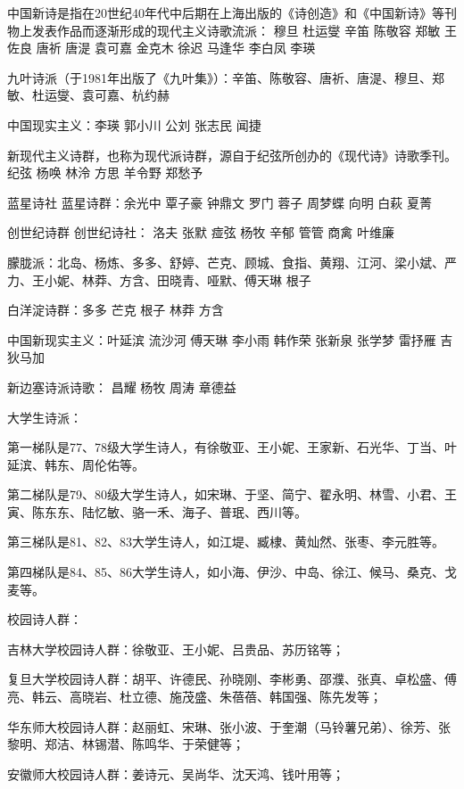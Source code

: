 \documentclass[UTF8]{../../RepresentationUniverse}
\begin{document}
中国新诗是指在20世纪40年代中后期在上海出版的《诗创造》和《中国新诗》等刊物上发表作品而逐渐形成的现代主义诗歌流派： 穆旦 杜运燮 辛笛 陈敬容 郑敏 王佐良 唐祈 唐湜 袁可嘉 金克木 徐迟 马逢华 李白凤 李瑛



九叶诗派（于1981年出版了《九叶集》）：辛笛、陈敬容、唐祈、唐湜、穆旦、郑敏、杜运燮、袁可嘉、杭约赫



中国现实主义：李瑛 郭小川 公刘 张志民 闻捷


新现代主义诗群，也称为现代派诗群，源自于纪弦所创办的《现代诗》诗歌季刊。纪弦 杨唤 林泠 方思 羊令野 郑愁予



蓝星诗社 蓝星诗群：余光中 覃子豪 钟鼎文 罗门 蓉子 周梦蝶 向明 白萩 夏菁


创世纪诗群 创世纪诗社： 洛夫 张默 痖弦 杨牧 辛郁 管管 商禽 叶维廉




朦胧派：北岛、杨炼、多多、舒婷、芒克、顾城、食指、黄翔、江河、梁小斌、严力、王小妮、林莽、方含、田晓青、哑默、傅天琳 根子 


白洋淀诗群：多多 芒克 根子 林莽 方含


中国新现实主义：叶延滨 流沙河 傅天琳 李小雨 韩作荣 张新泉 张学梦 雷抒雁 吉狄马加


新边塞诗派诗歌： 昌耀 杨牧 周涛 章德益




大学生诗派：

第一梯队是77、78级大学生诗人，有徐敬亚、王小妮、王家新、石光华、丁当、叶延滨、韩东、周伦佑等。

第二梯队是79、80级大学生诗人，如宋琳、于坚、简宁、翟永明、林雪、小君、王寅、陈东东、陆忆敏、骆一禾、海子、普珉、西川等。

第三梯队是81、82、83大学生诗人，如江堤、臧棣、黄灿然、张枣、李元胜等。

第四梯队是84、85、86大学生诗人，如小海、伊沙、中岛、徐江、候马、桑克、戈麦等。

校园诗人群：

吉林大学校园诗人群：徐敬亚、王小妮、吕贵品、苏历铭等；

复旦大学校园诗人群：胡平、许德民、孙晓刚、李彬勇、邵濮、张真、卓松盛、傅亮、韩云、高晓岩、杜立德、施茂盛、朱蓓蓓、韩国强、陈先发等；

华东师大校园诗人群：赵丽虹、宋琳、张小波、于奎潮（马铃薯兄弟）、徐芳、张黎明、郑洁、林锡潜、陈鸣华、于荣健等；

安徽师大校园诗人群：姜诗元、吴尚华、沈天鸿、钱叶用等；
\end{document}
